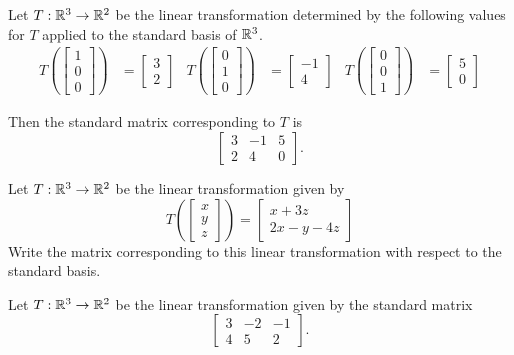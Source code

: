 \begin{applicationActivities}{1}{17}
\begin{example}
Let $T: \mathbb{R}^3 \rightarrow \mathbb{R}^2$ be the linear transformation determined by
the following values for \(T\) applied to the standard basis of \(\mathbb{R}^3\).
\begin{align*}
T\left(\begin{bmatrix} 1 \\ 0 \\ 0 \end{bmatrix} \right) &= \begin{bmatrix} 3 \\ 2\end{bmatrix} &
T\left(\begin{bmatrix} 0 \\ 1 \\ 0 \end{bmatrix} \right) &= \begin{bmatrix} -1 \\ 4\end{bmatrix} &
T\left(\begin{bmatrix} 0 \\ 0 \\ 1 \end{bmatrix} \right) &= \begin{bmatrix} 5 \\ 0\end{bmatrix}
\end{align*}

Then the standard matrix corresponding to $T$
is $$\begin{bmatrix}3 & -1 & 5 \\ 2 & 4 & 0 \end{bmatrix}.$$
\end{example}

\begin{activity}{5}
  Let $T: \mathbb{R}^3 \rightarrow \mathbb{R}^2$ be the linear transformation given by
$$T\left(\begin{bmatrix} x\\ y \\ z \end{bmatrix} \right) = \begin{bmatrix} x+3z \\ 2x-y-4z \end{bmatrix}$$
Write the matrix corresponding to this linear transformation with respect to the standard basis.
\end{activity}

\begin{activity}{5}
  Let $T: \mathbb{R}^3 \rightarrow \mathbb{R}^2$ be the linear transformation given by the standard matrix $$\begin{bmatrix} 3  & -2 & -1  \\ 4 & 5 & 2 \end{bmatrix}.$$


\end{activity}
\end{applicationActivities}
